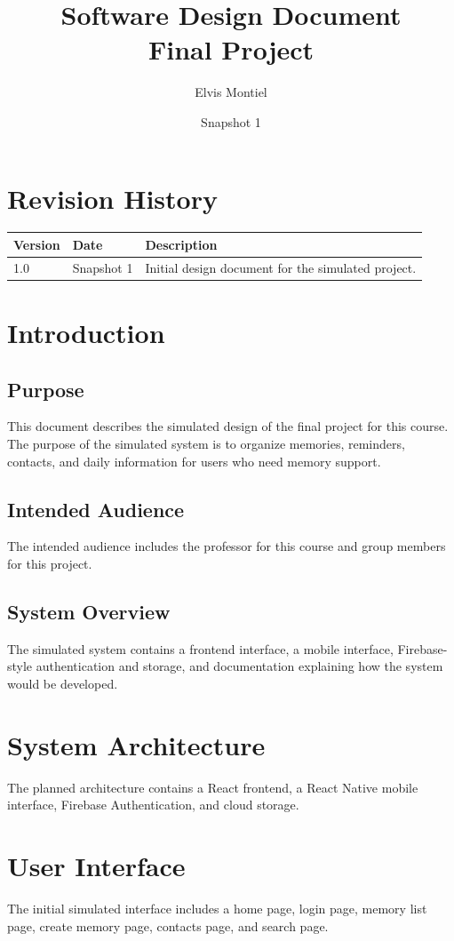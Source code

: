 \documentclass{article}
\title{Software Design Document\\Final Project}
\author{Elvis Montiel}
\date{Snapshot 1}
\begin{document}
\maketitle
\tableofcontents
\newpage

\section{Revision History}
\begin{longtable}{|p{2cm}|p{3cm}|p{8cm}|}
\hline
Version & Date & Description \\ \hline
1.0 & Snapshot 1 & Initial design document for the simulated project. \\ \hline
\end{longtable}

\section{Introduction}
\subsection{Purpose}
This document describes the simulated design of the final project for this course. The purpose of the simulated system is to organize memories, reminders, contacts, and daily information for users who need memory support.

\subsection{Intended Audience}
The intended audience includes the professor for this course and group members for this project.

\subsection{System Overview}
The simulated system contains a frontend interface, a mobile interface, Firebase-style authentication and storage, and documentation explaining how the system would be developed.

\section{System Architecture}
The planned architecture contains a React frontend, a React Native mobile interface, Firebase Authentication, and cloud storage.

\section{User Interface}
The initial simulated interface includes a home page, login page, memory list page, create memory page, contacts page, and search page.
\end{document}
